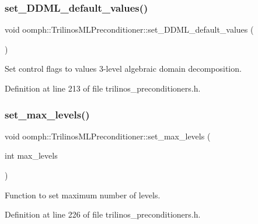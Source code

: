 \subsubsection{\texorpdfstring{set\+\_\+\+D\+D\+M\+L\+\_\+default\+\_\+values()}{set\_DDML\_default\_values()}}
{\footnotesize\ttfamily void oomph\+::\+Trilinos\+M\+L\+Preconditioner\+::set\+\_\+\+D\+D\+M\+L\+\_\+default\+\_\+values (\begin{DoxyParamCaption}{ }\end{DoxyParamCaption})\hspace{0.3cm}{\ttfamily [inline]}}



Set control flags to values 3-\/level algebraic domain decomposition. 



Definition at line 213 of file trilinos\+\_\+preconditioners.\+h.

\mbox{\label{classoomph_1_1TrilinosMLPreconditioner_a1f3c1aa0c8397df016e9eca960b51708}} 
\subsubsection{\texorpdfstring{set\+\_\+max\+\_\+levels()}{set\_max\_levels()}}
{\footnotesize\ttfamily void oomph\+::\+Trilinos\+M\+L\+Preconditioner\+::set\+\_\+max\+\_\+levels (\begin{DoxyParamCaption}\item[{int}]{max\+\_\+levels }\end{DoxyParamCaption})\hspace{0.3cm}{\ttfamily [inline]}}



Function to set maximum number of levels. 



Definition at line 226 of file trilinos\+\_\+preconditioners.\+h.

\mbox{\label{classoomph_1_1TrilinosMLPreconditioner_a4124512fc8fe6295243b563995f2a53e}} 
